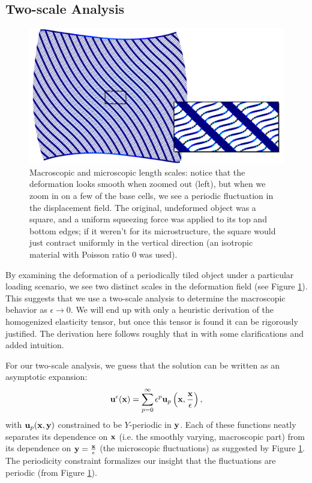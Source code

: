 \documentclass[10pt]{article}
\providecommand{\e}{\epsilon}
\begin{document}
\subsection{Two-scale Analysis}
\begin{figure}
    \centering
    \includegraphics[width=.6\textwidth]{Images/two_scale.png}
    \caption{Macroscopic and microscopic length scales: notice that the
             deformation looks smooth when zoomed out (left), but when we zoom
             in on a few of the base cells, we see a periodic fluctuation
             in the displacement field. The original, undeformed object was a
             square, and a uniform squeezing force was applied to its top and
             bottom edges; if it weren't for its microstructure, the square
             would just contract uniformly in the vertical direction (an
             isotropic material with Poisson ratio 0 was used).}
    \label{fig:two_scale}
\end{figure}
By examining the deformation of a periodically tiled object under a particular
loading scenario, we see two distinct scales in the deformation field (see
Figure \ref{fig:two_scale}). This suggests that we use a two-scale analysis to
determine the macroscopic behavior as $\e \to 0$. We will end up with only a
heuristic derivation of the homogenized elasticity tensor, but once this tensor
is found it can be rigorously justified. The derivation here follows roughly
that in \cite{allaire2002shape} with some clarifications and added intuition.

For our two-scale analysis, we guess that the solution can be written as an asymptotic
expansion:
$$
{\bf u}^\e({\bf x}) = \sum_{p = 0}^{\infty} \e^p {\bf u}_p\left({\bf x}, \frac{{\bf x}}{\e}\right),
$$
with ${\bf u}_p({\bf x}, {\bf y})$ constrained to be $Y$-periodic in ${\bf y}$.
Each of these functions neatly separates its dependence on ${\bf x}$ (i.e. the
smoothly varying, macroscopic part) from its dependence on ${\bf y} = \frac{{\bf
x}}{\e}$ (the microscopic fluctuations) as suggested by Figure
\ref{fig:two_scale}. The periodicity constraint formalizes our insight that
the fluctuations are periodic (from Figure \ref{fig:two_scale}).
\end{document}
